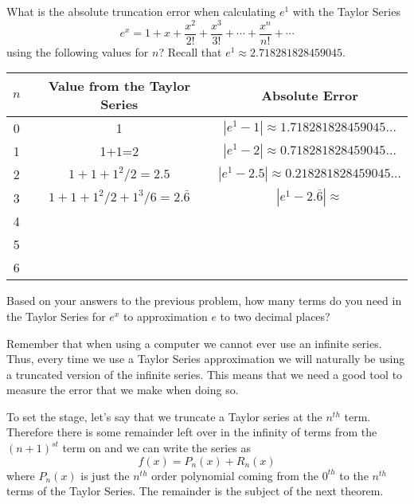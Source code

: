 \begin{problem}
    What is the absolute truncation error when calculating $e^1$ with the Taylor Series
    \[ e^x = 1 + x + \frac{x^2}{2!} + \frac{x^3}{3!} + \cdots + \frac{x^n}{n!} + \cdots \]
    using the following values for $n$? Recall that $e^1 \approx 2.718281828459045$.
    \begin{center}
        \begin{tabular}{|c|c|c|}
            \hline
            $n$ & Value from the Taylor Series & Absolute Error \\ \hline \hline
            0 & 1 & $|e^1 - 1| \approx 1.718281828459045\ldots$ \\ \hline
            1 & 1+1=2 & $|e^1 - 2| \approx 0.718281828459045\ldots$ \\ \hline
            2 & $1+1+1^2/2=2.5$ & $|e^1 - 2.5| \approx 0.218281828459045\ldots$ \\ \hline
            3 & $1+1+1^2/2+1^3/6=2.\bar{6}$ & $|e^1 - 2.\bar{6}| \approx$  \\ \hline
            4 & & \\ \hline
            5 & & \\ \hline
            6 & & \\ \hline
        \end{tabular}
    \end{center}
\end{problem}

\begin{problem}
    Based on your answers to the previous problem, how many terms do you need in the
    Taylor Series for $e^x$ to approximation $e$ to two decimal places?
\end{problem}

Remember that when using a computer we cannot ever use an
infinite series.  Thus, every time we use a Taylor Series approximation we will naturally
be using a truncated version of the infinite series.  This means that we need a good tool
to measure the error that we make when doing so.  

To set the stage, let's say that we truncate a Taylor series at the $n^{th}$ term.
Therefore there is some remainder left over in the infinity of terms from the $(n+1)^{st}$
term on and we can write the series as
\[ f(x) = P_n(x) + R_n(x) \]
where $P_n(x)$ is just the $n^{th}$ order polynomial coming from the $0^{th}$ to the
$n^{th}$ terms of the Taylor Series.  The remainder is the subject of the next theorem.

